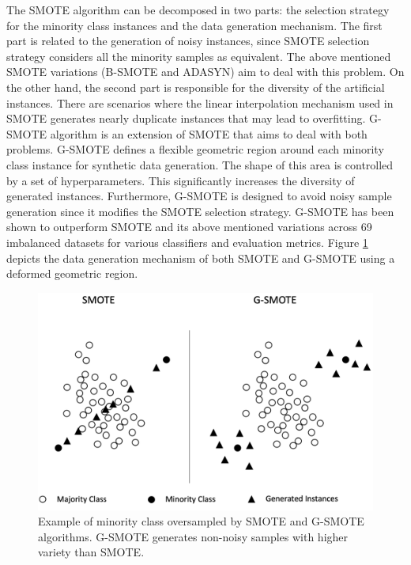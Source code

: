 \documentclass[remotesensing,article,submit,moreauthors,pdftex]{Definitions/mdpi}
\begin{document}
The SMOTE algorithm can be decomposed in two parts: the selection strategy for
the minority class instances and the data generation mechanism. The first part
is related to the generation of noisy instances, since SMOTE selection strategy
considers all the minority samples as equivalent. The above mentioned SMOTE
variations (B-SMOTE and ADASYN) aim to deal with this problem. On the other
hand, the second part is responsible for the diversity of the artificial
instances. There are scenarios where the linear interpolation mechanism used in
SMOTE generates nearly duplicate instances that may lead to overfitting. G-SMOTE
algorithm is an extension of SMOTE that aims to deal with both problems. G-SMOTE
defines a flexible geometric region around each minority class instance for
synthetic data generation. The shape of this area is controlled by a set of
hyperparameters. This significantly increases the diversity of generated
instances. Furthermore, G-SMOTE is designed to avoid noisy sample generation
since it modifies the SMOTE selection strategy. G-SMOTE has been shown to
outperform SMOTE and its above  mentioned variations across 69 imbalanced
datasets for various classifiers and evaluation metrics. Figure
\ref{fig:gsmote_smote} depicts the data generation mechanism of both SMOTE and
G-SMOTE using a deformed geometric region.

\begin{figure}[H]
	\centering
	\includegraphics[width=1\linewidth]{../analysis/gsmote_smote}
	\caption{Example of minority class oversampled by SMOTE and G-SMOTE
	algorithms. G-SMOTE generates non-noisy samples
	with higher variety than SMOTE.}
	\label{fig:gsmote_smote}
\end{figure}
\end{document}
